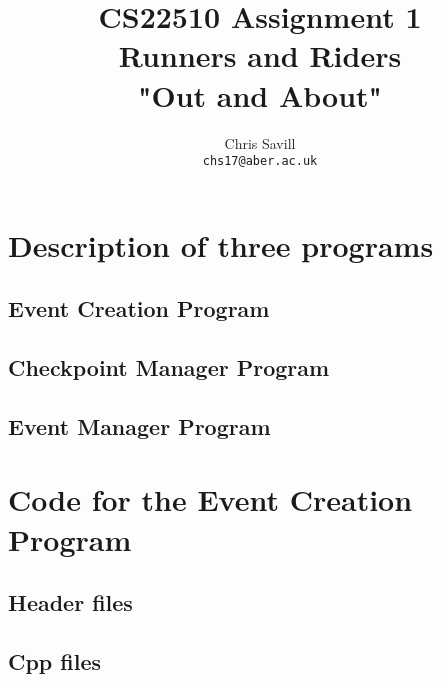 \documentclass[a4paper,12pt]{article}
\title{CS22510 Assignment 1\\
Runners and Riders\\
"Out and About"}
\author{Chris Savill\\\texttt{chs17@aber.ac.uk}}
\begin{document}
\maketitle
\newpage
\tableofcontents
\newpage

\section{Description of three programs}

\subsection{Event Creation Program}

\subsection{Checkpoint Manager Program}

\subsection{Event Manager Program}

\section{Code for the Event Creation Program}
\subsection{Header files}





\subsection{Cpp files}




\end{document}
